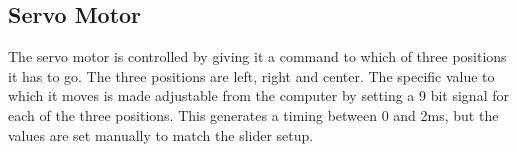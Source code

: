 \subsection{Servo Motor}
The servo motor is controlled by giving it a command to which of three positions it has to go.
The three positions are left, right and center.
The specific value to which it moves is made adjustable from the computer by setting a 9 bit signal for each of the three positions.
This generates a timing between 0 and 2ms, but the values are set manually to match the slider setup.



